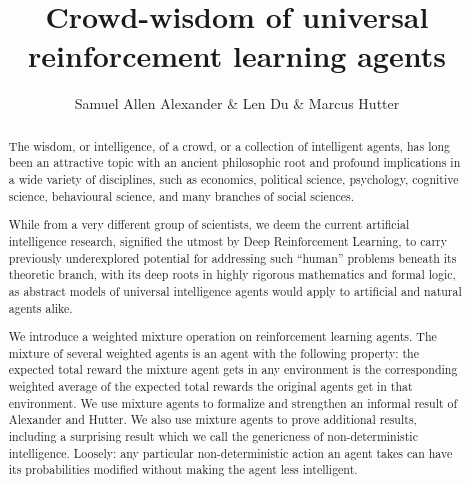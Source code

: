 \documentclass{article}
\begin{document}
\title{ Crowd-wisdom of universal reinforcement learning agents }
\author{Samuel Allen Alexander \& Len Du \& Marcus Hutter}


\maketitle

\begin{abstract}
The wisdom, or intelligence, of a crowd, or a collection of intelligent agents, has long been an attractive topic with an ancient philosophic root and profound implications in a wide variety of disciplines, such as economics, political science, psychology, cognitive science, behavioural science, and many branches of social sciences.

While from a very different group of scientists, we deem the current artificial intelligence research,
signified the utmost by Deep Reinforcement Learning,
to carry previously underexplored potential for addressing such ``human'' problems beneath its theoretic branch,
with its deep roots in highly rigorous mathematics and formal logic,
as abstract models of universal intelligence agents would apply to artificial and natural agents alike.

We introduce a weighted mixture operation on
reinforcement learning agents. The mixture of several weighted agents is
an agent with the
following property: the expected total reward the mixture agent
gets in any environment is the corresponding weighted average
of the expected total rewards the original agents get in that
environment. We use mixture agents to formalize and
strengthen an informal result of Alexander and Hutter. We also use mixture
agents to prove additional results, including a surprising result
which we call the genericness of non-deterministic intelligence. Loosely:
any particular non-deterministic action an agent takes
can have its probabilities modified without making the agent less
intelligent.
\end{abstract}

%
%
\end{document}
